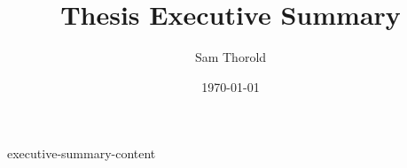 \documentclass[a4paper, 11pt]{article}
\title{
  Thesis Executive Summary
}
\author{Sam Thorold}
\date{\today}
\begin{document}
\maketitle

{executive-summary-content}

\printbibliography
\end{document}
